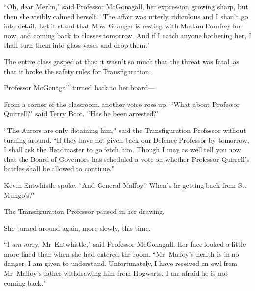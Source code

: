 ``Oh, dear Merlin," said Professor McGonagall, her expression growing sharp, but then she visibly calmed herself. ``The affair was utterly ridiculous and I shan't go into detail. Let it stand that Miss~Granger is resting with Madam Pomfrey for now, and coming back to classes tomorrow. And if I catch anyone bothering her, I shall turn them into glass vases and drop them."

The entire class gasped at this; it wasn't so much that the threat was fatal, as that it broke the safety rules for Transfiguration.

Professor McGonagall turned back to her board—

From a corner of the classroom, another voice rose up. ``What about Professor Quirrell?" said Terry Boot. ``Has he been arrested?"

``The Aurors are only detaining him," said the Transfiguration Professor without turning around. ``If they have not given back our Defence Professor by tomorrow, I shall ask the Headmaster to go fetch him. Though I may as well tell you now that the Board of Governors has scheduled a vote on whether Professor Quirrell's battles shall be allowed to continue."

Kevin Entwhistle spoke. ``And General Malfoy? When's he getting back from St. Mungo's?"

The Transfiguration Professor paused in her drawing.

She turned around again, more slowly, this time.

``I \emph{am} sorry, Mr~Entwhistle," said Professor McGonagall. Her face looked a little more lined than when she had entered the room. ``Mr~Malfoy's health is in no danger, I am given to understand. Unfortunately, I have received an owl from Mr~Malfoy's father withdrawing him from Hogwarts. I am afraid he is not coming back."
